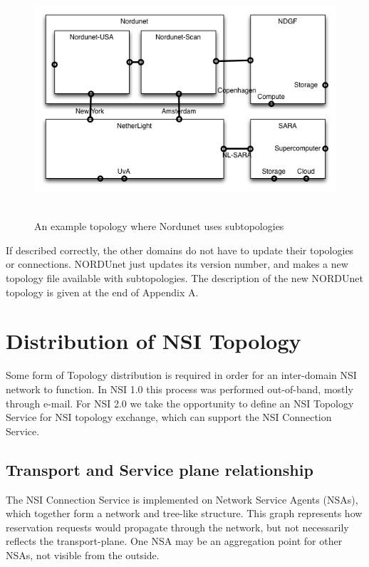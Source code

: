 \documentclass[12pt]{article}  %
\begin{document}
\begin{figure}[htbp]
\begin{center}
\includegraphics[width=403pt, height=248pt]{NSITopologyService-fig002.png}
\caption{An example topology where Nordunet uses subtopologies}\label{fig:ndgf2}
\end{center}
\end{figure}


 If described correctly, the other domains do not have to update 
their topologies or connections. NORDUnet just updates its version number, and 
makes a new topology file available with subtopologies. The description of the 
new NORDUnet topology is given at the end of Appendix A.\label{h.ikfi9yd4mu6x}


\section{Distribution of NSI Topology}

 Some form of Topology distribution is required in order for an 
inter-domain NSI network to function. In NSI 1.0 this process was performed out-of-band, 
mostly through e-mail. For NSI 2.0 we take the opportunity to define an NSI Topology 
Service for NSI topology exchange, which can support the NSI Connection Service.\label{h.c2129mkn366h}


\subsection{Transport and Service plane relationship}

 The NSI Connection Service is implemented on Network Service Agents 
(NSAs), which together form a network and tree-like structure. This graph represents 
how reservation requests would propagate through the network, but not necessarily 
reflects the transport-plane. One NSA may be an aggregation point for other NSAs, 
not visible from the outside.\label{h.mtia1ajwgzmv}
\end{document}
